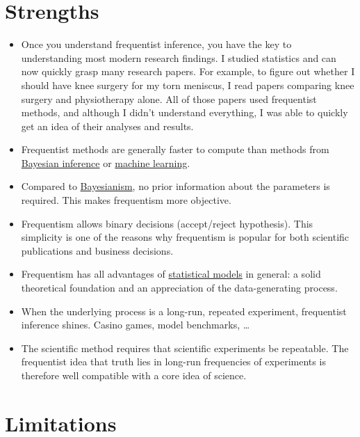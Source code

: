 \documentclass[
  10pt,
]{scrbook}
\providecommand{\tightlist}{%
  \setlength{\itemsep}{0pt}\setlength{\parskip}{0pt}}
\begin{document}
\hypertarget{strengths-1}{%
\section{Strengths}\label{strengths-1}}

\begin{itemize}
\tightlist
\item
  Once you understand frequentist inference, you have the key to understanding most modern research findings. I studied statistics and can now quickly grasp many research papers. For example, to figure out whether I should have knee surgery for my torn meniscus, I read papers comparing knee surgery and physiotherapy alone. All of those papers used frequentist methods, and although I didn't understand everything, I was able to quickly get an idea of their analyses and results.
\item
  Frequentist methods are generally faster to compute than methods from \protect\hyperlink{bayesian-inference}{Bayesian inference} or \protect\hyperlink{supervised-ml}{machine learning}.
\item
  Compared to \protect\hyperlink{bayesian-inference}{Bayesianism}, no prior information about the parameters is required. This makes frequentism more objective.
\item
  Frequentism allows binary decisions (accept/reject hypothesis). This simplicity is one of the reasons why frequentism is popular for both scientific publications and business decisions.
\item
  Frequentism has all advantages of \protect\hyperlink{statistical-modeling}{statistical models} in general: a solid theoretical foundation and an appreciation of the data-generating process.
\item
  When the underlying process is a long-run, repeated experiment, frequentist inference shines. Casino games, model benchmarks, \ldots{}
\item
  The scientific method requires that scientific experiments be repeatable. The frequentist idea that truth lies in long-run frequencies of experiments is therefore well compatible with a core idea of science.
\end{itemize}

\hypertarget{limitations-1}{%
\section{Limitations}\label{limitations-1}}
\end{document}
